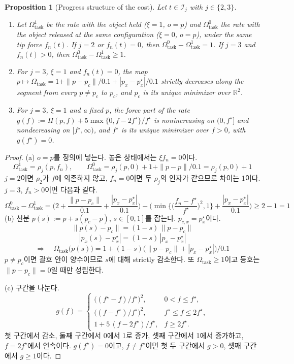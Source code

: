 \documentclass[11pt]{article}\usepackage[margin=1in]{geometry}\usepackage{amsmath,amssymb,amsthm,mathtools}\usepackage{graphicx}\graphicspath{{figures/}{../figures/}{figs/}{./}}\usepackage{enumitem}\usepackage{hyperref}\usepackage{cleveref}\usepackage{tikz}\usetikzlibrary{arrows.meta,positioning,calc,shapes.geometric}\usepackage{float}\usepackage{rotating}\usepackage[most]{tcolorbox}\usepackage{kotex}\usepackage{booktabs}\usepackage{longtable}\emergencystretch=1.6em\tolerance=2000 \crefname{assumption}{Assumption}{Assumptions}\Crefname{assumption}{Assumption}{Assumptions}\crefname{definition}{Definition}{Definitions}\Crefname{definition}{Definition}{Definitions}\crefname{proposition}{Proposition}{Propositions}\Crefname{proposition}{Proposition}{Propositions}\crefname{fact}{Fact}{Facts}\Crefname{fact}{Fact}{Facts} \newtheorem{assumption}{Assumption}\newtheorem{definition}{Definition}\newtheorem{lemma}{Lemma}\newtheorem{proposition}{Proposition}\newtheorem{theorem}{Theorem}\newtheorem{corollary}{Corollary}\newtheorem{fact}{Fact}\theoremstyle{remark}\newtheorem{remark}{Remark} \newcommand{\R}{\mathbb{R}}\newcommand{\xb}{\bar x}\newcommand{\Ab}{\bar A}\newcommand{\By}{\bar B_y}\newcommand{\U}{\mathcal U}\newcommand{\Z}{\mathcal Z}
\begin{document}
\begin{proposition}[Progress structure of the cost]
\label{prop:costprog}
Let $t\in\mathcal I_j$ with $j\in\{2,3\}$.
\begin{enumerate}[label=(\alph*)]
\item Let $\Omega^1_{\mathrm{task}}$ be the rate with the object held ($\xi=1$, $o=p$) and $\Omega^0_{\mathrm{task}}$ the rate with the object released at the same configuration ($\xi=0$, $o=p$), under the same tip force $f_n(t)$. If $j=2$ or $f_n(t)=0$, then $\Omega^0_{\mathrm{task}}-\Omega^1_{\mathrm{task}}=1$. If $j=3$ and $f_n(t)>0$, then $\Omega^0_{\mathrm{task}}-\Omega^1_{\mathrm{task}}\ge1$.
\item For $j=3$, $\xi=1$ and $f_n(t)=0$, the map $p\mapsto\Omega_{\mathrm{task}}=1+\|p-p_c\|/0.1+|p_x-p^\star_x|/0.1$ strictly decreases along the segment from every $p\ne p_c$ to $p_c$, and $p_c$ is its unique minimizer over $\R^2$.
\item For $j=3$, $\xi=1$ and a fixed $p$, the force part of the rate $g(f):=\Pi(p,f)+5\max\{0,f-2f^\star\}/f^\star$ is nonincreasing on $(0,f^\star]$ and nondecreasing on $[f^\star,\infty)$, and $f^\star$ is its unique minimizer over $f>0$, with $g(f^\star)=0$.
\end{enumerate}
\end{proposition}

\begin{proof}
(a) $o=p$를 정의에 넣는다. 놓은 상태에서는 $\xi f_n=0$이다.
\[
\Omega^1_{\mathrm{task}}=\rho_j(p,f_n),\qquad \Omega^0_{\mathrm{task}}=\rho_j(p,0)+1+\|p-p\|/0.1=\rho_j(p,0)+1
\]
$j=2$이면 $\rho_2$가 $f$에 의존하지 않고, $f_n=0$이면 두 $\rho_j$의 인자가 같으므로 차이는 1이다. $j=3$, $f_n>0$이면 다음과 같다.
\[
\Omega^0_{\mathrm{task}}-\Omega^1_{\mathrm{task}}=\Big(2+\frac{\|p-p_c\|}{0.1}+\frac{|p_x-p^\star_x|}{0.1}\Big)-\Big(\min\Big\{\Big(\frac{f_n-f^\star}{f^\star}\Big)^2,1\Big\}+\frac{|p_x-p^\star_x|}{0.1}\Big)\ge2-1=1
\]
(b) 선분 $p(s):=p+s(p_c-p)$, $s\in[0,1]$를 잡는다. $p_{c,x}=p^\star_x$이다.
\[
\|p(s)-p_c\|=(1-s)\,\|p-p_c\|
\]
\[
|p_x(s)-p^\star_x|=(1-s)\,|p_x-p^\star_x|
\]
\[
\Longrightarrow\quad \Omega_{\mathrm{task}}\big(p(s)\big)=1+(1-s)\big(\|p-p_c\|+|p_x-p^\star_x|\big)/0.1
\]
$p\ne p_c$이면 괄호 안이 양수이므로 $s$에 대해 strictly 감소한다. 또 $\Omega_{\mathrm{task}}\ge1$이고 등호는 $\|p-p_c\|=0$일 때만 성립한다.

(c) 구간을 나눈다.
\[
g(f)=\begin{cases}\big((f^\star-f)/f^\star\big)^2, & 0<f\le f^\star,\\ \big((f-f^\star)/f^\star\big)^2, & f^\star\le f\le 2f^\star,\\ 1+5\,(f-2f^\star)/f^\star, & f\ge 2f^\star.\end{cases}
\]
첫 구간에서 감소, 둘째 구간에서 0에서 1로 증가, 셋째 구간에서 1에서 증가하고, $f=2f^\star$에서 연속이다. $g(f^\star)=0$이고, $f\ne f^\star$이면 첫 두 구간에서 $g>0$, 셋째 구간에서 $g\ge1$이다.
\end{proof}
\end{document}
